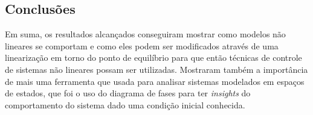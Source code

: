 \subsection{Conclusões}
Em suma, os resultados alcançados conseguiram mostrar como modelos não lineares
se comportam e como eles podem ser modificados através de uma linearização em
torno do ponto de equilíbrio para que então técnicas de controle de sistemas não
lineares possam ser utilizadas. Mostraram também a importância de mais uma
ferramenta que usada para analisar sistemas modelados em espaços de estados, que
foi o uso do diagrama de fases para ter \textit{insights} do comportamento do
sistema dado uma condição inicial conhecida.
